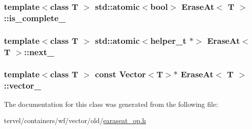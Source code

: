 \subsubsection[{is\+\_\+complete\+\_\+}]{\setlength{\rightskip}{0pt plus 5cm}template$<$class T $>$ std\+::atomic$<$bool$>$ {\bf Erase\+At}$<$ T $>$\+::is\+\_\+complete\+\_\+}\label{class_erase_at_a7a0e20cf5a5e02822dd1d0a3d486920c}
\hypertarget{class_erase_at_a6fe6f561569a440fa9f8631d6c06d895}{}
\subsubsection[{next\+\_\+}]{\setlength{\rightskip}{0pt plus 5cm}template$<$class T $>$ std\+::atomic$<$helper\+\_\+t $\ast$$>$ {\bf Erase\+At}$<$ T $>$\+::next\+\_\+}\label{class_erase_at_a6fe6f561569a440fa9f8631d6c06d895}
\hypertarget{class_erase_at_a7a24a5872cd3fa48cb71711b96e15af9}{}
\subsubsection[{vector\+\_\+}]{\setlength{\rightskip}{0pt plus 5cm}template$<$class T $>$ const Vector$<$T$>$$\ast$ {\bf Erase\+At}$<$ T $>$\+::vector\+\_\+}\label{class_erase_at_a7a24a5872cd3fa48cb71711b96e15af9}


The documentation for this class was generated from the following file\+:\begin{DoxyCompactItemize}
\item 
tervel/containers/wf/vector/old/\hyperlink{earaseat__op_8h}{earaseat\+\_\+op.\+h}\end{DoxyCompactItemize}
